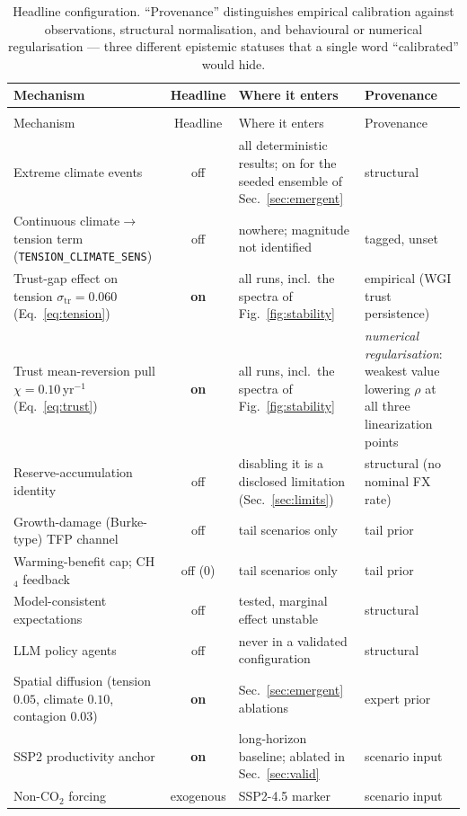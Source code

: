 \documentclass[12pt,a4paper]{article}
\begin{document}
\begingroup\small
\setlength{\LTcapwidth}{\linewidth}
\begin{xltabular}{\linewidth}{@{}>{\raggedright\arraybackslash}p{4.2cm} c L >{\raggedright\arraybackslash}p{2.6cm}@{}}
\caption{Headline configuration. ``Provenance'' distinguishes empirical calibration against
observations, structural normalisation, and behavioural or numerical regularisation --- three
different epistemic statuses that a single word ``calibrated'' would hide.}\label{tab:config}\\
\toprule
Mechanism & Headline & Where it enters & Provenance \\
\midrule
\endfirsthead
{}\\
\toprule
Mechanism & Headline & Where it enters & Provenance \\
\midrule
\endhead
\bottomrule
\endlastfoot

Extreme climate events & off & all deterministic results; on for the seeded ensemble of Sec.~\ref{sec:emergent} & structural \\
Continuous climate$\to$tension term (\texttt{TENSION\_CLIMATE\_SENS}) & off & nowhere; magnitude not identified \citep{hsiang2013,buhaug2014} & tagged, unset \\
Trust-gap effect on tension $\sigma_{\mathrm{tr}}=0.060$ (Eq.~\ref{eq:tension}) & \textbf{on} & all runs, incl.\ the spectra of Fig.~\ref{fig:stability} & empirical (WGI trust persistence) \\
Trust mean-reversion pull $\chi=0.10$\,yr$^{-1}$ (Eq.~\ref{eq:trust}) & \textbf{on} & all runs, incl.\ the spectra of Fig.~\ref{fig:stability} & \emph{numerical regularisation}: weakest value lowering $\rho$ at all three linearization points \\
Reserve-accumulation identity & off & disabling it is a disclosed limitation (Sec.~\ref{sec:limits}) & structural (no nominal FX rate) \\
Growth-damage (Burke-type) TFP channel & off & tail scenarios only \citep{burke2015,burke2023} & tail prior \\
Warming-benefit cap; CH$_4$ feedback & off ($0$) & tail scenarios only & tail prior \\
Model-consistent expectations & off & tested, marginal effect unstable & structural \\
LLM policy agents & off & never in a validated configuration & structural \\
Spatial diffusion (tension $0.05$, climate $0.10$, contagion $0.03$) & \textbf{on} & Sec.~\ref{sec:emergent} ablations & expert prior \\
SSP2 productivity anchor & \textbf{on} & long-horizon baseline; ablated in Sec.~\ref{sec:valid} & scenario input \\
Non-CO$_2$ forcing & exogenous & SSP2-4.5 marker \citep{meinshausen2020} & scenario input \\
\end{xltabular}
\endgroup
\end{document}
